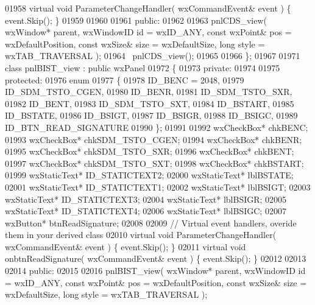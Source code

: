 \begin{DoxyCode}
01958         \textcolor{keyword}{virtual} \textcolor{keywordtype}{void} ParameterChangeHandler( wxCommandEvent& event ) \{ \textcolor{keyword}{event}.Skip(); \}
01959         
01960     
01961     \textcolor{keyword}{public}:
01962         
01963         pnlCDS_view( wxWindow* parent, wxWindowID \textcolor{keywordtype}{id} = wxID\_ANY, \textcolor{keyword}{const} wxPoint& pos = wxDefaultPosition, \textcolor{keyword}{
      const} wxSize& size = wxDefaultSize, \textcolor{keywordtype}{long} style = wxTAB\_TRAVERSAL ); 
01964         ~pnlCDS_view();
01965     
01966 \};
01967 
01971 \textcolor{keyword}{class }pnlBIST_view : \textcolor{keyword}{public} wxPanel 
01972 \{
01973     \textcolor{keyword}{private}:
01974     
01975     \textcolor{keyword}{protected}:
01976         \textcolor{keyword}{enum}
01977         \{
01978             ID\_BENC = 2048,
01979             ID_SDM_TSTO_CGEN,
01980             ID_BENR,
01981             ID_SDM_TSTO_SXR,
01982             ID_BENT,
01983             ID_SDM_TSTO_SXT,
01984             ID_BSTART,
01985             ID_BSTATE,
01986             ID_BSIGT,
01987             ID_BSIGR,
01988             ID_BSIGC,
01989             ID\_BTN\_READ\_SIGNATURE
01990         \};
01991         
01992         wxCheckBox* chkBENC;
01993         wxCheckBox* chkSDM_TSTO_CGEN;
01994         wxCheckBox* chkBENR;
01995         wxCheckBox* chkSDM_TSTO_SXR;
01996         wxCheckBox* chkBENT;
01997         wxCheckBox* chkSDM_TSTO_SXT;
01998         wxCheckBox* chkBSTART;
01999         wxStaticText* ID_STATICTEXT2;
02000         wxStaticText* lblBSTATE;
02001         wxStaticText* ID_STATICTEXT1;
02002         wxStaticText* lblBSIGT;
02003         wxStaticText* ID_STATICTEXT3;
02004         wxStaticText* lblBSIGR;
02005         wxStaticText* ID_STATICTEXT4;
02006         wxStaticText* lblBSIGC;
02007         wxButton* btnReadSignature;
02008         
02009         \textcolor{comment}{// Virtual event handlers, overide them in your derived class}
02010         \textcolor{keyword}{virtual} \textcolor{keywordtype}{void} ParameterChangeHandler( wxCommandEvent& event ) \{ \textcolor{keyword}{event}.Skip(); \}
02011         \textcolor{keyword}{virtual} \textcolor{keywordtype}{void} onbtnReadSignature( wxCommandEvent& event ) \{ \textcolor{keyword}{event}.Skip(); \}
02012         
02013     
02014     \textcolor{keyword}{public}:
02015         
02016         pnlBIST_view( wxWindow* parent, wxWindowID \textcolor{keywordtype}{id} = wxID\_ANY, \textcolor{keyword}{const} wxPoint& pos = wxDefaultPosition, \textcolor{keyword}{
      const} wxSize& size = wxDefaultSize, \textcolor{keywordtype}{long} style = wxTAB\_TRAVERSAL ); 

\end{DoxyCode}
